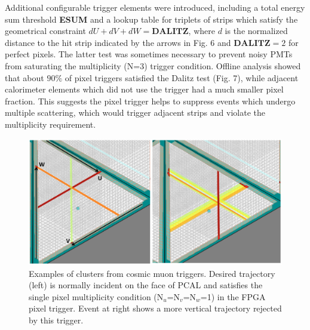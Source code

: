 Additional configurable trigger elements were introduced, including a total energy sum threshold \textbf{ESUM} and a lookup table for triplets of strips which satisfy the geometrical constraint $dU+dV+dW=\textbf{DALITZ}$, where $d$ is the normalized distance to the hit strip indicated by the arrows in Fig. 6 and $\textbf{DALITZ}=2$ for perfect pixels.  The latter test was sometimes necessary to prevent noisy PMTs from saturating the multiplicity (N=3) trigger condition.  Offline analysis showed that about $90\%$ of pixel triggers satisfied the Dalitz test (Fig. 7), while adjacent calorimeter elements which did not use the trigger had a much smaller pixel fraction.  This suggests the pixel trigger helps to suppress events which undergo multiple scattering, which would trigger adjacent strips and violate the multiplicity requirement.
\begin{figure}[!htb]
 \centering
  \includegraphics[width=0.95\columnwidth,keepaspectratio]{img/TwoClusters.png}
 \caption{Examples of clusters from cosmic muon triggers.  Desired trajectory (left) is normally incident on the face of PCAL and satisfies the single pixel multiplicity condition (N$_u$=N$_v$=N$_w$=1) in the FPGA pixel trigger.  Event at right shows a more vertical trajectory rejected by this trigger.}
\end{figure}

